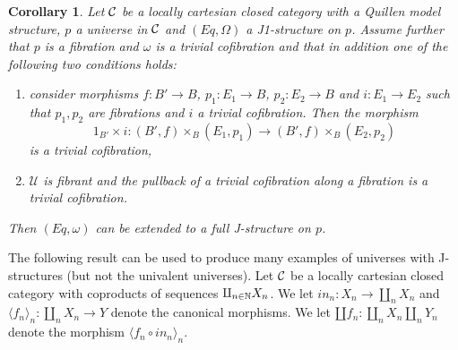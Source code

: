 \documentclass[12pt]{article}
\numberwithin{equation}{section}
\newtheorem{cor}[proposition]{Corollary}
\newcommand{\llabel}[1]{\label{#1}}
\newcommand{\sr}{\rightarrow}
\newcommand{\nn}{{\mathbb N\rm}}
\newcommand{\id}{1}            %
\newcommand{\U}{\mathcal{U}}
\begin{document}
\begin{cor}
\llabel{2015.05.18.cor1} Let $\cal C$ be a locally cartesian closed category
with a Quillen model structure, $p$ a universe in $\cal C$ and $(Eq,\Omega)$ a
J1-structure on $p$. Assume further that $p$ is a fibration and $\omega$ is a
trivial cofibration and that in addition one of the following two conditions
holds:
%
\begin{enumerate}
\item consider morphisms $f: B'\sr B$, $p_1:E_1\sr B$, $p_2:E_2\sr B$ and
  $i:E_1\sr E_2$ such that $p_1,p_2$ are fibrations and $i$ a trivial
  cofibration. Then the morphism
%
$$\id_{B'}\times i: (B',f)\times_B(E_1,p_1)\sr (B',f)\times_B(E_2,p_2)$$
%
is a trivial cofibration,
%
\item $\U$ is fibrant and the pullback of a trivial cofibration along a
  fibration is a trivial cofibration.
\end{enumerate}
%
Then $(Eq,\omega)$ can be extended to a full J-structure on $p$.
\end{cor}
%

The following result can be used to produce many examples of universes with
J-structures (but not the univalent universes). Let $\cal C$ be a locally
cartesian closed category with coproducts of sequences
$\amalg_{n\in\nn}X_n$. We let $in_n:X_n\sr \amalg_n X_n$ and $\langle f_n
\rangle_{n} : \amalg_n X_n\sr Y$ denote the canonical morphisms. We let $\amalg
f_n : \amalg_n X_n \amalg_n Y_n$ denote the morphism $\langle f_n\circ in_n
\rangle_{n}$.
\end{document}
